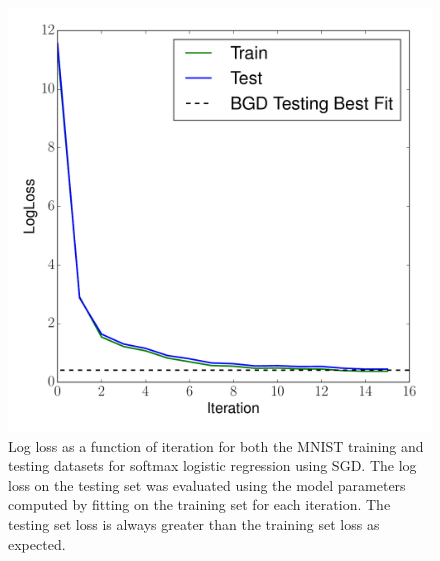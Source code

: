\documentclass[12pt]{amsart}
\begin{document}
\begin{figure}[H]
	\includegraphics[width=\columnwidth]{sgd_mnist_multi_train_test_ll.pdf}
    \caption{Log loss as a function of iteration for both the MNIST training and testing datasets for softmax logistic regression using SGD.  The log loss on the testing set was evaluated using the model parameters computed by fitting on the training set for each iteration.  The testing set loss is always greater than the training set loss as expected.}
    \label{fig:sgd_mnist_ll}
\end{figure}
\end{document}
